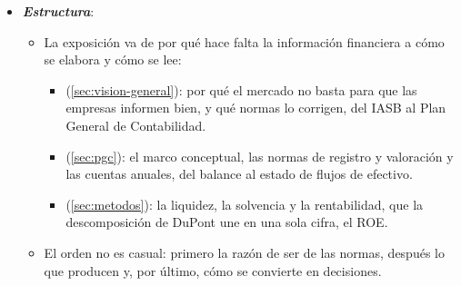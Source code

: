 \documentclass[11pt]{article}
\begin{document}
\begin{itemize}
\item \textbf{\emph{Estructura}}:
  \begin{itemize}
  \item La exposición va de por qué hace falta la información financiera a cómo se elabora y cómo se lee:
  \begin{itemize}
  \item {} (\ref{sec:vision-general}): por qué el mercado no basta para que las empresas informen bien, y qué normas lo corrigen, del IASB al Plan General de Contabilidad.
  \item {} (\ref{sec:pgc}): el marco conceptual, las normas de registro y valoración y las cuentas anuales, del balance al estado de flujos de efectivo.
  \item {} (\ref{sec:metodos}): la liquidez, la solvencia y la rentabilidad, que la descomposición de DuPont une en una sola cifra, el ROE.
  \end{itemize}
  \item El orden no es casual: primero la razón de ser de las normas, después lo que producen y, por último, cómo se convierte en decisiones.
  \end{itemize}
\end{itemize}
\end{document}
